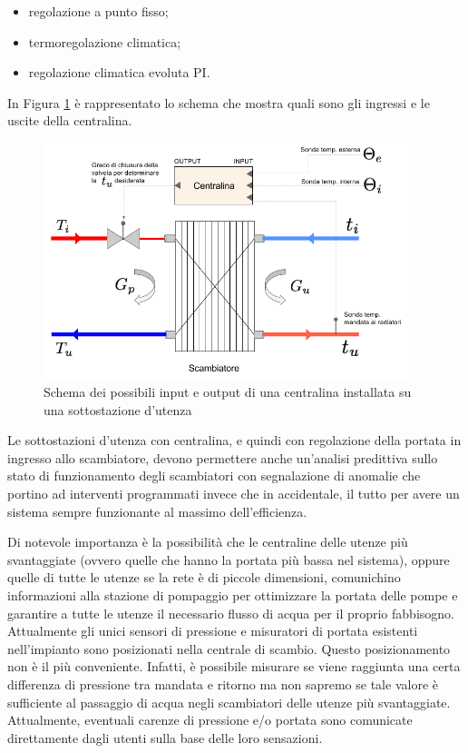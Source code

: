 \documentclass[laurea,oneside,11pt]{USiena_tesiLM3}
\begin{document}
\begin{itemize}
\item regolazione a punto fisso;
\item termoregolazione climatica;
\item regolazione climatica evoluta PI.
\end{itemize}  

In Figura \ref{fig:schema_centralina} è  rappresentato lo schema che mostra quali sono gli ingressi e le uscite della centralina.

\begin{figure}[!ht]
\centering
\includegraphics[width=0.95\textwidth]{figure/schema_centralina} 
\caption{Schema dei possibili input e output di una centralina installata su una sottostazione d'utenza}
\label{fig:schema_centralina}
\end{figure}


Le sottostazioni d'utenza con centralina, e quindi con regolazione della portata in ingresso allo scambiatore, devono permettere anche un'analisi  predittiva sullo stato di funzionamento degli scambiatori con segnalazione di anomalie che portino ad interventi programmati invece che in accidentale, il tutto per avere un sistema sempre funzionante al massimo dell'efficienza.

Di notevole importanza è la possibilità che le centraline delle utenze più svantaggiate (ovvero quelle che hanno la portata più bassa nel sistema), oppure quelle di tutte le utenze se la rete è di piccole dimensioni, comunichino informazioni alla stazione di pompaggio per ottimizzare la portata delle pompe e garantire a tutte le utenze il necessario flusso di acqua per il proprio fabbisogno. Attualmente gli unici sensori di pressione e misuratori di portata esistenti nell'impianto sono posizionati nella centrale di scambio. Questo posizionamento non è il più conveniente. Infatti, è possibile misurare se viene raggiunta una certa differenza di pressione tra mandata e ritorno ma non sapremo se tale valore  è sufficiente al passaggio di acqua negli scambiatori delle utenze più svantaggiate. Attualmente, eventuali carenze di pressione e/o portata sono comunicate direttamente dagli utenti sulla base delle loro sensazioni.
\end{document}
